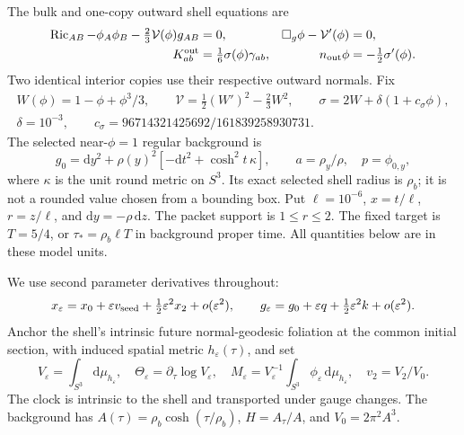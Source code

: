 \documentclass[11pt]{article}
\newcommand{\eps}{\varepsilon}
\newcommand{\dd}{\mathrm d}
\newcommand{\cV}{\mathcal V}
\begin{document}
The bulk and one-copy outward shell equations are
\begin{align}
 \operatorname{Ric}_{AB}-\phi_A\phi_B-\tfrac23\cV(\phi)g_{AB}&=0,
 &\Box_g\phi-\cV'(\phi)&=0, \label{eq:model}\\
 K^{\rm out}_{ab}&=\tfrac16\sigma(\phi)\gamma_{ab},
 &n_{\rm out}\phi&=-\tfrac12\sigma'(\phi). \label{eq:shell}
\end{align}
Two identical interior copies use their respective outward normals. Fix
\begin{gather}
 W(\phi)=1-\phi+\phi^3/3,\qquad
 \cV=\tfrac12(W')^2-\tfrac23W^2,\qquad
 \sigma=2W+\delta(1+c_\sigma\phi),\nonumber\\
 \delta=10^{-3},\qquad c_\sigma=96714321425692/161839258930731.
 \label{eq:potential}
\end{gather}
The selected near-$\phi=1$ regular background is
\begin{equation}
 g_0=\dd y^2+\rho(y)^2[-\dd t^2+\cosh^2t\,\kappa],\qquad
 a=\rho_y/\rho,\quad p=\phi_{0,y}, \label{eq:background}
\end{equation}
where $\kappa$ is the unit round metric on $S^3$. Its exact selected shell
radius is $\rho_b$; it is not a rounded value chosen from a bounding box.
Put $\ell=10^{-6}$, $x=t/\ell$, $r=z/\ell$, and
$\dd y=-\rho\,\dd z$. The packet support is $1\le r\le2$.
The fixed target is $T=5/4$, or $\tau_*=\rho_b\ell T$ in background
proper time. All quantities below are in these model units.

We use second parameter derivatives throughout:
\begin{equation}
 x_\eps=x_0+\eps v_{\rm seed}+\tfrac12\eps^2x_2+o(\eps^2),\qquad
 g_\eps=g_0+\eps q+\tfrac12\eps^2k+o(\eps^2).
 \label{eq:factorial}
\end{equation}
Anchor the shell's intrinsic future normal-geodesic foliation at the
common initial section, with induced spatial metric $h_\eps(\tau)$, and set
\begin{equation}
 V_\eps=\int_{S^3}\dd\mu_{h_\eps},\quad
 \Theta_\eps=\partial_\tau\log V_\eps,\quad
 M_\eps=V_\eps^{-1}\int_{S^3}\phi_\eps\,\dd\mu_{h_\eps},\quad
 v_2=V_2/V_0. \label{eq:observables}
\end{equation}
The clock is intrinsic to the shell and transported under gauge changes.
The background has $A(\tau)=\rho_b\cosh(\tau/\rho_b)$,
$H=A_\tau/A$, and $V_0=2\pi^2A^3$.
\end{document}
